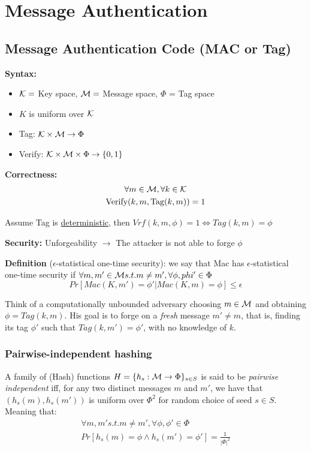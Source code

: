 
\section{Message Authentication}

\subsection{Message Authentication Code (MAC or Tag)}

\textbf{Syntax:}

\begin{itemize}
    \item $\mathcal{K} =$ Key space, $\mathcal{M}=$ Message space, $\Phi$ = Tag space
    \item $K$ is uniform over $\mathcal{K}$
    \item Tag: $\mathcal{K} \times \mathcal{M} \to \Phi$
    \item Verify: $\mathcal{K} \times \mathcal{M} \times \Phi \to \{0,1\}$
\end{itemize}

\textbf{Correctness:}
\begin{gather*}
    \forall m \in \mathcal{M}, \forall k \in \mathcal{K} \\
    \text{Verify}(k,m,\text{Tag}(k,m))=1    
\end{gather*}

Assume Tag is \underline{deterministic}, then $Vrf(k,m,\phi)=1 \Leftrightarrow Tag(k,m)=\phi$

\noindent\textbf{Security:} Unforgeability $\rightarrow$ The attacker is not able to forge $\phi$

\noindent\textbf{Definition} ($\epsilon$-statistical one-time security): we say that Mac has $\epsilon$-statistical one-time security if
$\forall m,m' \in \mathcal{M} s.t. m\neq m', \forall \phi,phi' \in \Phi$
$$Pr[Mac(K,m')=\phi'|Mac(K,m)=\phi]\leq \epsilon$$

Think of a computationally unbounded adversary choosing $m \in \mathcal{M}$ and obtaining $\phi = Tag(k, m)$. His goal is to forge on a \emph{fresh} message $m' \neq m$, that is, finding its tag $\phi'$ such that $Tag(k,m') = \phi'$, with no knowledge of $k$.

\subsubsection{Pairwise-independent hashing}

\begin{definition}
    A family of (Hash) functions $H=\{h_s:\mathcal{M} \to \Phi\}_{s\in S}$ is said to be \emph{pairwise independent} iff, for any two distinct messages $m$ and $m'$, we have that $(h_s(m),h_s(m'))$ is uniform over $\Phi^2$ for random choice of seed $s \in S$. Meaning that:
    \begin{gather*}
        \forall m,m' s.t. m\neq m',\forall \phi,\phi' \in \Phi \\
        Pr[h_s(m)=\phi \wedge h_s(m')=\phi']=\frac{1}{|\Phi|^2}
    \end{gather*}
\end{definition}


